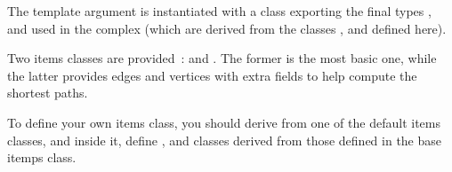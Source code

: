 The template argument  is instantiated with a class exporting the
final types ,  and  used in the complex
(which are derived from the classes ,  and 
defined here).

Two items classes are provided~:  and
. The former is the most basic one, while the
latter provides edges and vertices with extra fields to help compute the
shortest paths.

To define your own items class, you should derive from one of the default
items classes, and inside it, define ,  and
 classes derived from those defined in the base itemps class.
